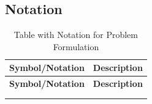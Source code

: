 

\subsection{Notation}



\begin{longtable}{|c|p{10cm}|}
\hline
\textbf{Symbol/Notation} & \textbf{Description} \\ \hline
\endfirsthead

\hline
\textbf{Symbol/Notation} & \textbf{Description} \\ \hline
\endhead

\hline
\endfoot

\hline
\caption{Table with Notation for Problem Formulation} \\
\endlastfoot


\end{longtable}
